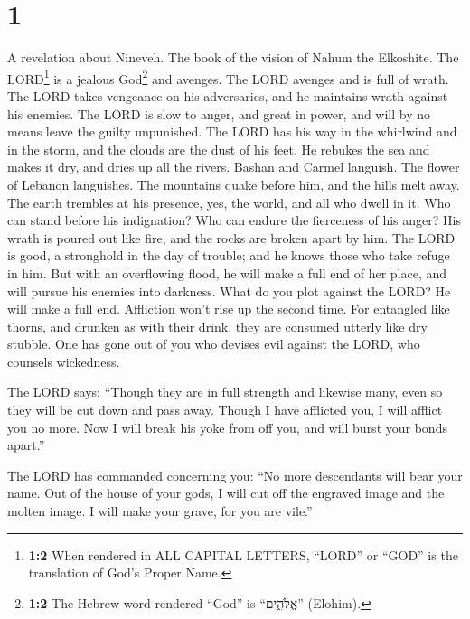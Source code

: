 \hypertarget{section}{%
\section{1}\label{section}}

 A revelation about Nineveh. The book of the vision of
Nahum the Elkoshite.  The LORD\footnote{\textbf{1:2} When
  rendered in ALL CAPITAL LETTERS, ``LORD'' or ``GOD'' is the
  translation of God's Proper Name.} is a jealous God\footnote{\textbf{1:2}
  The Hebrew word rendered ``God'' is ``אֱלֹהִ֑ים'' (Elohim).} and
avenges. The LORD avenges and is full of wrath. The LORD takes vengeance
on his adversaries, and he maintains wrath against his enemies.
 The LORD is slow to anger, and great in power, and will
by no means leave the guilty unpunished. The LORD has his way in the
whirlwind and in the storm, and the clouds are the dust of his feet.
 He rebukes the sea and makes it dry, and dries up all the
rivers. Bashan and Carmel languish. The flower of Lebanon languishes.
 The mountains quake before him, and the hills melt away.
The earth trembles at his presence, yes, the world, and all who dwell in
it.  Who can stand before his indignation? Who can endure
the fierceness of his anger? His wrath is poured out like fire, and the
rocks are broken apart by him.  The LORD is good, a
stronghold in the day of trouble; and he knows those who take refuge in
him.  But with an overflowing flood, he will make a full
end of her place, and will pursue his enemies into darkness.
 What do you plot against the LORD? He will make a full
end. Affliction won't rise up the second time.  For
entangled like thorns, and drunken as with their drink, they are
consumed utterly like dry stubble.  One has gone out of
you who devises evil against the LORD, who counsels wickedness.

 The LORD says: ``Though they are in full strength and
likewise many, even so they will be cut down and pass away. Though I
have afflicted you, I will afflict you no more.  Now I
will break his yoke from off you, and will burst your bonds apart.''

 The LORD has commanded concerning you: ``No more
descendants will bear your name. Out of the house of your gods, I will
cut off the engraved image and the molten image. I will make your grave,
for you are vile.''


